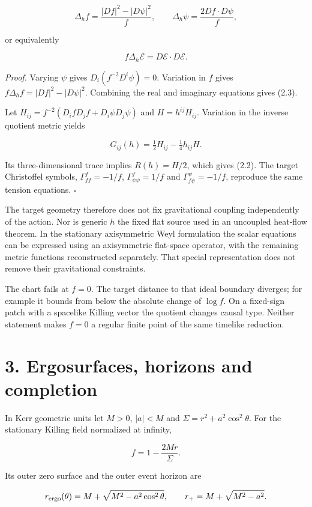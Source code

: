 \documentclass[
  11pt,
  a4paper,
]{article}
\begin{document}
\[
\Delta_h f=\frac{|Df|^2-|D\psi|^2}{f},
\qquad \Delta_h\psi=\frac{2Df\cdot D\psi}{f},
\]

or equivalently

\[
f\Delta_h\mathcal E=D\mathcal E\cdot D\mathcal E.
\tag{2.3}
\]

\emph{Proof.} Varying \(\psi\) gives \(D_i(f^{-2}D^i\psi)=0\). Variation in \(f\) gives \(f\Delta_h f=|Df|^2-|D\psi|^2\). Combining the real and imaginary equations gives (2.3).

Let \(H_{ij}=f^{-2}(D_i fD_j f+D_i\psi D_j\psi)\) and \(H=h^{ij}H_{ij}\). Variation in the inverse quotient metric yields

\[
G_{ij}(h)=\tfrac12H_{ij}-\tfrac14h_{ij}H.
\]

Its three-dimensional trace implies \(R(h)=H/2\), which gives (2.2). The target Christoffel symbols, \(\Gamma^f_{ff}=-1/f\), \(\Gamma^f_{\psi\psi}=1/f\) and \(\Gamma^\psi_{f\psi}=-1/f\), reproduce the same tension equations. \(\square\)

The target geometry therefore does not fix gravitational coupling independently of the action. Nor is generic \(h\) the fixed flat source used in an uncoupled heat-flow theorem. In the stationary axisymmetric Weyl formulation the scalar equations can be expressed using an axisymmetric flat-space operator, with the remaining metric functions reconstructed separately. That special representation does not remove their gravitational constraints.

The chart fails at \(f=0\). The target distance to that ideal boundary diverges; for example it bounds from below the absolute change of \(\log f\). On a fixed-sign patch with a spacelike Killing vector the quotient changes causal type. Neither statement makes \(f=0\) a regular finite point of the same timelike reduction.

\section{3. Ergosurfaces, horizons and completion}\label{ergosurfaces-horizons-and-completion}

In Kerr geometric units let \(M>0\), \(|a|<M\) and \(\Sigma=r^2+a^2\cos^2\theta\). For the stationary Killing field normalized at infinity,

\[
f=1-\frac{2Mr}{\Sigma}.
\]

Its outer zero surface and the outer event horizon are

\[
r_{\rm ergo}(\theta)=M+\sqrt{M^2-a^2\cos^2\theta},
\qquad r_+=M+\sqrt{M^2-a^2}.
\]
\end{document}

